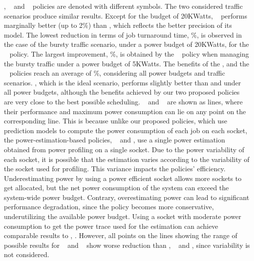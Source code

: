 \par
\PRVSSched, \PMCVSSched~ and \IVSSched~ policies are denoted with different symbols.  The
two considered traffic scenarios produce similar results.  Except for the budget of
20KWatts, \PMCVSSched~ performs marginally better (up to 2\%) than \PRVSSched, which
reflects the better precision of its model.  The lowest reduction in terms of job
turnaround time, \EstMaxJTT\%, is observed in the case of the bursty traffic scenario,
under a power budget of 20KWatts, for the \PMCVSSched~ policy.  The largest improvement,
\EstMinJTT\%, is obtained by the \PMCVSSched~ policy when managing the bursty traffic
under a power budget of 5KWatts.  The benefits of the \PRVSSched, and the \PMCVSSched~
policies reach an average of \AvgJTT\%, considering all power budgets and traffic
scenarios.  \IVSSched, which is the ideal scenario, performs slightly better than
\PRVSSched and \PMCVSSched under all power budgets, although the benefits achieved by our
two proposed policies are very close to the best possible scheduling.  \PESched~ and
\PEVASched~ are shown as lines, where their performance and maximum power consumption can
lie on any point on the corresponding line.  This is because unlike our proposed policies,
which use prediction models to compute the power consumption of each job on each socket,
the power-estimation-based policies, \PESched~ and \PEVASched, use a single power
estimation obtained from power profiling on a single socket.  Due to the power variability
of each socket, it is possible that the estimation varies according to the variability of
the socket used for profiling.  This variance impacts the policies' efficiency.
Underestimating power by using a power efficient socket allows more sockets to get
allocated, but the net power consumption of the system can exceed the system-wide power
budget.  Contrary, overestimating power can lead to significant performance degradation,
since the policy becomes more conservative, underutilizing the available power budget.
Using a socket with moderate power consumption to get the power trace used for the
estimation can achieve comparable results to \PRVSSched, \PMCVSSched.  However, all points
on the lines showing the range of possible results for \PESched~ and \PEVASched~ show
worse reduction than \PRVSSched, \PMCVSSched~ and \IVSSched, since variability is not
considered.
